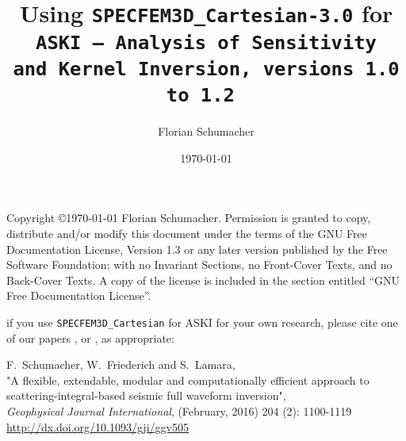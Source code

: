\documentclass[12pt,a4paper]{article}
\newcommand{\lcode}[1]{\nolinkurl{#1}}
\newcommand{\ASKI}{ {\ttfamily ASKI} }
\begin{document}
\sloppy
%
\setlength{\parindent}{0cm}
\addtolength{\parskip}{0.5em}
%
%
%
\title{Using {\tt \Huge SPECFEM3D\_Cartesian-3.0} for \\ \tt {\Huge ASKI} {\rm--} {\Huge A}{\large nalysis of} {\Huge S}{\large ensitivity \\ and} {\Huge\tt K}{\large ernel} {\Huge\tt I}{\large nversion, versions 1.0 to 1.2} }
\author[1]{Florian Schumacher}
\date{\mydate \today}
\maketitle
%
Copyright \copyright {\myyear \today} Florian Schumacher.
Permission is granted to copy, distribute and/or modify this document
under the terms of the GNU Free Documentation License, Version 1.3
or any later version published by the Free Software Foundation;
with no Invariant Sections, no Front-Cover Texts, and no Back-Cover Texts.
A copy of the license is included in the section entitled ``GNU
Free Documentation License''.

\vspace{0.7cm}

if you use \lcode{SPECFEM3D_Cartesian} for \ASKI{} for your own research, please cite 
one of our papers \cite{Schumacher16}, or \cite{Schumacher16b}, as appropriate:

F.\ Schumacher, W.\ Friederich and S.\ Lamara, \\
"A flexible, extendable, modular and 
computationally efficient approach to scattering-integral-based seismic full waveform 
inversion", \\
\emph{Geophysical Journal International}, (February, 2016) 204 (2): 1100-1119\\
\url{http://dx.doi.org/10.1093/gji/ggv505}
\end{document}
